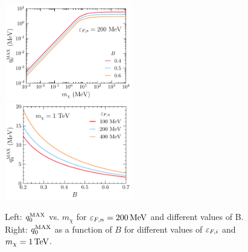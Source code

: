 \begin{figure}[t!bp]
    \centering
    \includegraphics[width = 0.495\textwidth]{capture_1/q0max_mdm.pdf}
    \includegraphics[width = 0.495\textwidth]{capture_1/q0max_B.pdf}

    \caption{Left: $q_0^{\rm MAX}$ vs. $m_\chi$ for $\varepsilon_{F,n}=200{\rm \,MeV}$ and different values of B. 
    Right: $q_0^{\rm MAX}$ as a function of $B$ for different values of $\varepsilon_{F,i}$ and $m_\chi=1{\rm \,TeV}$.}
    \label{ch3:fig:q0max}
\end{figure}

